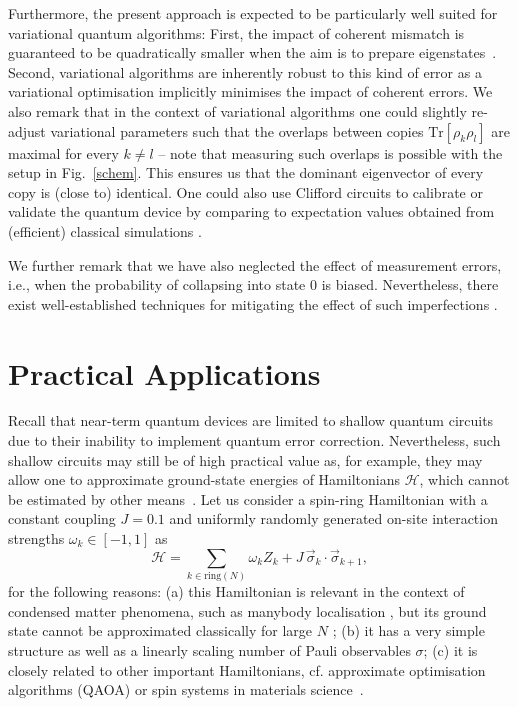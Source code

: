 \documentclass[aps,prx,showpacs,twocolumn,reprint]{revtex4-2}
\newcommand{\tr}{\mathrm{Tr}}
\begin{document}
{Furthermore, the present approach is expected to be particularly well suited for variational quantum
algorithms: First, the impact of coherent mismatch is
guaranteed to be quadratically smaller when the aim is to prepare eigenstates~\cite{koczor2021dominant}.
Second, variational algorithms are inherently robust to this kind of error as a variational optimisation
implicitly minimises the impact of coherent errors.
We also remark that in the context of variational algorithms one could slightly re-adjust
variational parameters such that the overlaps between copies $\tr[\rho_k \rho_l]$
are maximal for every $k \neq l$ -- note that measuring such overlaps is possible with the
setup in Fig.~\ref{schem}. This ensures us that the dominant eigenvector of every
copy is (close to) identical.
One could also use Clifford circuits to calibrate or validate the quantum device by
comparing to expectation values obtained from (efficient) classical simulations \cite{strikis2020learning, czarnik2020error}.


We further remark that we have also neglected the effect of measurement errors, i.e.,
when the probability of collapsing into state $0$ is biased. Nevertheless, there exist
well-established techniques for mitigating the effect of such imperfections
\cite{maciejewski2020mitigation,endo2020hybrid}.




\section{Practical Applications}

Recall that near-term quantum devices are limited to
shallow quantum circuits due to their inability to implement quantum error correction.
Nevertheless, such shallow circuits may still be of high practical value as, for example,  they may allow one
to approximate ground-state energies of Hamiltonians $\mathcal{H}$, which
cannot be estimated by other means~\cite{cerezo2020variationalreview,endo2020hybrid,bharti2021noisy,
	farhi2014quantum,peruzzo2014variational,wang2015quantum,PRXH2,PhysRevA.95.020501,mcclean2016theory}.
Let us consider a spin-ring Hamiltonian with a constant coupling $J=0.1$ and uniformly
randomly generated on-site interaction strengths $\omega_k \in [-1,1]$ as 
\begin{equation}\label{spin_ring}
	\mathcal{H} =  \sum_{k \in \text{ring}(N)} \omega_k Z_k  + J \, \vec{\sigma}_k \cdot \vec{\sigma}_{k+1},
\end{equation}
for the following reasons:
(a) this Hamiltonian is relevant in the context of condensed matter
phenomena, such as manybody localisation \cite{nandkishore2015many}, but its
ground state cannot be approximated classically for large $N$ \cite{spin_ring_hamil,childs2018toward};
(b) it has a very simple structure as well as a linearly scaling number of Pauli observables $\sigma$;
(c) it is closely related to other important Hamiltonians, cf. approximate optimisation algorithms
(QAOA) or spin systems in materials science~\cite{cerezo2020variationalreview,endo2020hybrid,bharti2021noisy, pagano2020quantum,arute2020quantum}.



}
\end{document}
